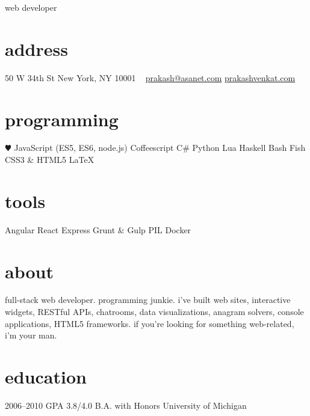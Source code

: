 \documentclass[]{friggeri-cv}
\begin{document}
       {web developer}


\begin{aside}
  \section{address}
    50 W 34th St
    New York, NY 10001
    ~
    \href{mailto:prakash@asanet.com}{prakash@asanet.com}
    \href{http://prakashvenkat.com}{prakashvenkat.com}
  \section{programming}
    {\color{red} $\varheartsuit$} JavaScript
    (ES5, ES6, node.js)
    Coffeescript
    C\#
    Python
    Lua
    Haskell
    Bash
    Fish
    CSS3 \& HTML5
    LaTeX
  \section{tools}
    Angular
    React
    Express
    Grunt \& Gulp
    PIL
    Docker
\end{aside}

\section{about}
full-stack web developer. programming junkie. i've built web sites, interactive widgets,
RESTful APIs, chatrooms, data visualizations, anagram solvers, console applications, 
HTML5 frameworks. if you're looking for something web-related, i'm your man.

\section{education}

\begin{entrylist}
  \entry
    {2006–2010}
    {GPA 3.8/4.0}
    {B.A. with Honors}
    {University of Michigan}
\end{entrylist}
\end{document}

